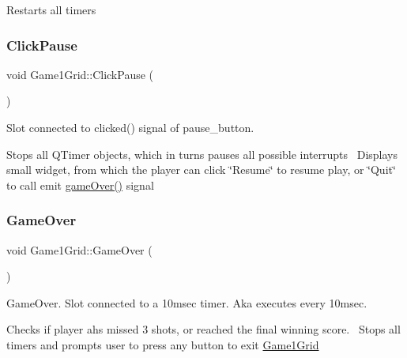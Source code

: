 Restarts all timers \mbox{\label{classGame1Grid_a9a6e5239a1b09f3f758503c24766583f}} 
\subsubsection{\texorpdfstring{Click\+Pause}{ClickPause}}
{\footnotesize\ttfamily void Game1\+Grid\+::\+Click\+Pause (\begin{DoxyParamCaption}{ }\end{DoxyParamCaption})\hspace{0.3cm}{\ttfamily [slot]}}



Slot connected to clicked() signal of pause\+\_\+button. 

Stops all Q\+Timer objects, which in turns pauses all possible interrupts~\newline
Displays small widget, from which the player can click \char`\"{}\+Resume\char`\"{} to resume play, or \char`\"{}\+Quit\char`\"{} to call emit \hyperlink{classGame1Grid_ae12a5e01c80683d7d8f3187d8b560a8c}{game\+Over()} signal \mbox{\label{classGame1Grid_a501210aa672a1e7593cb9be3ff238464}} 
\subsubsection{\texorpdfstring{Game\+Over}{GameOver}}
{\footnotesize\ttfamily void Game1\+Grid\+::\+Game\+Over (\begin{DoxyParamCaption}{ }\end{DoxyParamCaption})\hspace{0.3cm}{\ttfamily [slot]}}



Game\+Over. Slot connected to a 10msec timer. Aka executes every 10msec. 

Checks if player ahs missed 3 shots, or reached the final winning score.~\newline
Stops all timers and prompts user to press any button to exit \hyperlink{classGame1Grid}{Game1\+Grid} \mbox{\label{classGame1Grid_af0ee0c96e8995ce18eddecafca1fdcfc}} 
